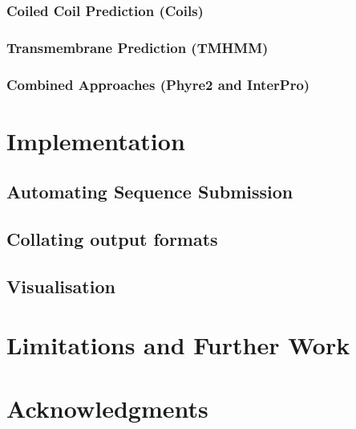 \documentclass[fleqn,10pt]{SelfArx} %
\begin{document}
\subsubsection*{Coiled Coil Prediction (Coils)}

\subsubsection*{Transmembrane Prediction (TMHMM)}

\subsubsection*{Combined Approaches (Phyre2 and InterPro)}

\section{Implementation}
\subsection{Automating Sequence Submission}
\subsection{Collating output formats}
\subsection{Visualisation}
\section{Limitations and Further Work}
\section*{Acknowledgments}





\end{document}
